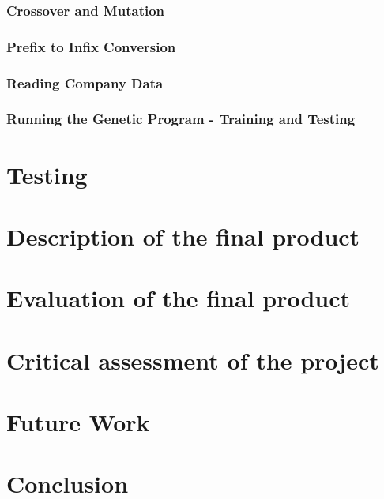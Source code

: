 \documentclass[11pt]{article}
\begin{document}
\subsubsection{Crossover and Mutation}
\subsubsection{Prefix to Infix Conversion}
\subsubsection{Reading Company Data}
\subsubsection{Running the Genetic Program - Training and Testing}
\newpage
\section{Testing}

\newpage
\section{Description of the final product}

\newpage
\section{Evaluation of the final product}

\newpage
\section{Critical assessment of the project }

\newpage
\section{Future Work}

\newpage
\section{Conclusion}
\end{document}
